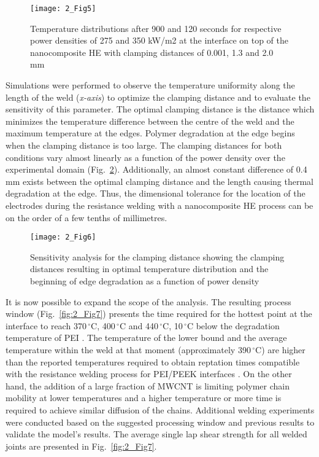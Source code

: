 \begin{figure}[ht]
	\center
	\texttt{[image: 2\_Fig5]}
	\caption{Temperature distributions after 900 and 120 seconds for respective power densities of 275 and 350 kW/m2 at the interface on top of the nanocomposite HE with clamping distances of 0.001, 1.3 and 2.0 mm \cite{Brassard2019b}}
	\label{fig:2_Fig5}
\end{figure} 

\FloatBarrier
Simulations were performed to observe the temperature uniformity along the length of the weld (\textit{x-axis}) to optimize the clamping distance and to evaluate the sensitivity of this parameter. 
The optimal clamping distance is the distance which minimizes the temperature difference between the centre of the weld and the maximum temperature at the edges. 
Polymer degradation at the edge begins when the clamping distance is too large. 
The clamping distances for both conditions vary almost linearly as a function of the power density over the experimental domain (\mbox{Fig. \ref{fig:2_Fig6}}). 
Additionally, an almost constant difference of \mbox{0.4\,mm} exists between the optimal clamping distance and the length causing thermal degradation at the edge. 
Thus, the dimensional tolerance for the location of the electrodes during the resistance welding with a nanocomposite HE process can be on the order of a few tenths of millimetres. 

\begin{figure}[ht]
	\center
	\texttt{[image: 2\_Fig6]}
	\caption{Sensitivity analysis for the clamping distance showing the clamping distances resulting in optimal temperature distribution and the beginning of edge degradation as a function of power density \cite{Brassard2019b}}
	\label{fig:2_Fig6}
\end{figure} 

It is now possible to expand the scope of the analysis. 
The resulting process window (\mbox{Fig. \ref{fig:2_Fig7}}) presents the time required for the hottest point at the interface to reach \mbox{370\,$^{\circ}$C}, \mbox{400\,$^{\circ}$C} and \mbox{440\,$^{\circ}$C}, \mbox{10\,$^{\circ}$C} below the degradation temperature of PEI \cite{Carroccio2000}. 
The temperature of the lower bound and the average temperature within the weld at that moment (approximately \mbox{390\,$^{\circ}$C}) are higher than the reported temperatures required to obtain reptation times compatible with the resistance welding process for PEI/PEEK interfaces \cite{Bastien1991}. 
On the other hand, the addition of a large fraction of MWCNT is limiting polymer chain mobility at lower temperatures \cite{Mu2009,Kabanemi2010} and a higher temperature or more time is required to achieve similar diffusion of the chains. 
Additional welding experiments were conducted based on the suggested processing window and previous results to validate the model’s results. 
The average single lap shear strength for all welded joints are presented in \mbox{Fig. \ref{fig:2_Fig7}}.  

